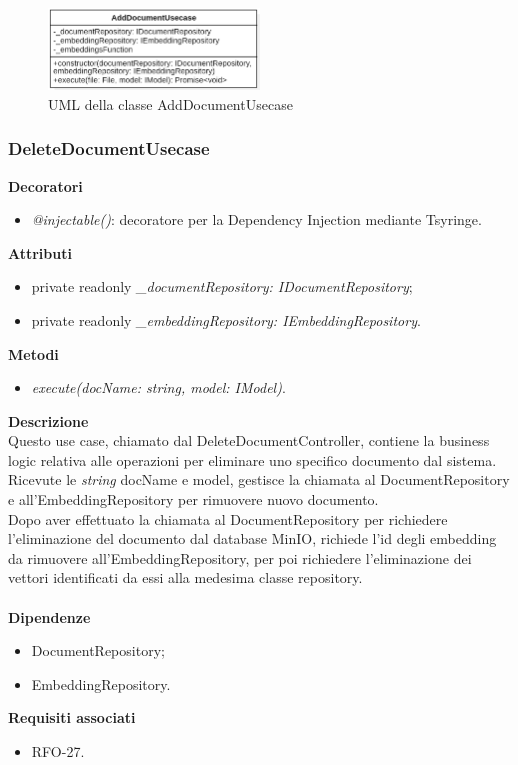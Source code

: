 \begin{figure}[h!]
    \centering  
    \includegraphics[width=0.5\textwidth]{AddDocumentUsecase.png}
    \caption{UML della classe AddDocumentUsecase}
\end{figure}

\subsubsection{DeleteDocumentUsecase}
\textbf{Decoratori}
\begin{itemize}
    \item \textit{@injectable()}: decoratore per la Dependency Injection mediante Tsyringe.
\end{itemize}
\textbf{Attributi}
\begin{itemize}[itemsep=-4pt]
    \item private readonly \textit{\_documentRepository: IDocumentRepository};
    \item private readonly \textit{\_embeddingRepository: IEmbeddingRepository}.
\end{itemize}
\textbf{Metodi}
\begin{itemize}
    \item \textit{execute(docName: string, model: IModel)}.
\end{itemize}
\textbf{Descrizione}\\
Questo use case, chiamato dal DeleteDocumentController, contiene la business logic relativa alle operazioni per eliminare uno specifico documento dal sistema. Ricevute le \textit{string} docName e model, gestisce la chiamata al DocumentRepository e all'EmbeddingRepository per rimuovere nuovo documento.\\
Dopo aver effettuato la chiamata al DocumentRepository per richiedere l'eliminazione del documento dal database MinIO, richiede l'id degli embedding da rimuovere all'EmbeddingRepository, per poi richiedere l'eliminazione dei vettori identificati da essi alla medesima classe repository. \\ \\
\textbf{Dipendenze}
\begin{itemize}[itemsep=-4pt]
    \item DocumentRepository;
    \item EmbeddingRepository.
\end{itemize}
\textbf{Requisiti associati}
\begin{itemize}
    \item RFO-27.
\end{itemize}

